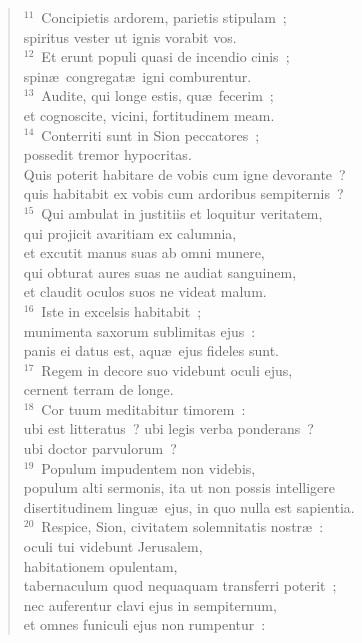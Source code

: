 \begin{flushleft}
\begin{verse}
${}^{11}$~Concipietis ardorem, parietis stipulam~;\\ spiritus vester ut ignis vorabit vos.\\
${}^{12}$~Et erunt populi quasi de incendio cinis~;\\ spin\ae\ congregat\ae\ igni comburentur.\\
${}^{13}$~Audite, qui longe estis, qu\ae\ fecerim~;\\ et cognoscite, vicini, fortitudinem meam.\\
${}^{14}$~Conterriti sunt in Sion peccatores~;\\ possedit tremor hypocritas.\\ Quis poterit habitare de vobis cum igne devorante~?\\ quis habitabit ex vobis cum ardoribus sempiternis~?\\
${}^{15}$~Qui ambulat in justitiis et loquitur veritatem,\\ qui projicit avaritiam ex calumnia,\\ et excutit manus suas ab omni munere,\\ qui obturat aures suas ne audiat sanguinem,\\ et claudit oculos suos ne videat malum.\\
${}^{16}$~Iste in excelsis habitabit~;\\ munimenta saxorum sublimitas ejus~:\\ panis ei datus est, aqu\ae\ ejus fideles sunt.\\
${}^{17}$~Regem in decore suo videbunt oculi ejus,\\ cernent terram de longe.\\
${}^{18}$~Cor tuum meditabitur timorem~:\\ ubi est litteratus~? ubi legis verba ponderans~?\\ ubi doctor parvulorum~?\\
${}^{19}$~Populum impudentem non videbis,\\ populum alti sermonis, ita ut non possis intelligere\\ disertitudinem lingu\ae\ ejus, in quo nulla est sapientia.\\
${}^{20}$~Respice, Sion, civitatem solemnitatis nostr\ae~:\\ oculi tui videbunt Jerusalem,\\ habitationem opulentam,\\ tabernaculum quod nequaquam transferri poterit~;\\ nec auferentur clavi ejus in sempiternum,\\ et omnes funiculi ejus non rumpentur~:\\

\end{verse}
\end{flushleft}
